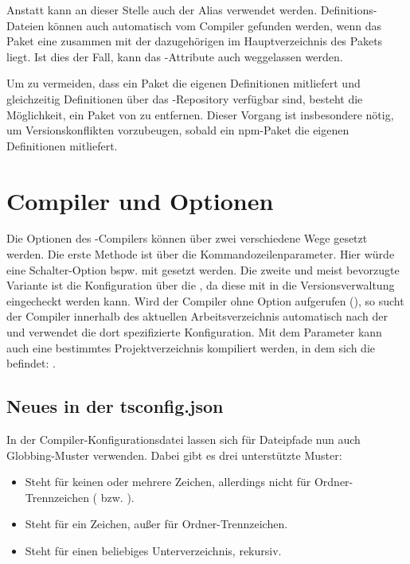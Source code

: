 Anstatt  kann an dieser Stelle auch der Alias  verwendet werden. Definitions-Dateien können auch automatisch vom Compiler gefunden werden, wenn das Paket eine  zusammen mit der dazugehörigen  im Hauptverzeichnis des Pakets liegt. Ist dies der Fall, kann das -Attribute auch weggelassen werden.

Um zu vermeiden, dass ein Paket die eigenen Definitionen mitliefert und gleichzeitig Definitionen über das \dt-Re\-po\-si\-to\-ry verfügbar sind, besteht die Möglichkeit, ein Paket von \dt zu entfernen. Dieser Vorgang ist insbesondere nötig, um  Versionskonflikten vorzubeugen, sobald ein npm-Paket die eigenen Definitionen mitliefert.

\section{Compiler und Optionen}
\label{options}
Die Optionen des \ts-Compilers können über zwei verschiedene Wege gesetzt werden. Die erste Methode ist über die Kommandozeilenparameter. Hier würde eine Schalter-Option bspw. mit  gesetzt werden. Die zweite und meist bevorzugte Variante ist die Konfiguration über die \tsconfig, da diese mit in die Versionsverwaltung eingecheckt werden kann. Wird der Compiler ohne Option aufgerufen (), so sucht der Compiler innerhalb des aktuellen Arbeitsverzeichnis automatisch nach der \tsconfig und verwendet die dort spezifizierte Konfiguration. Mit dem Parameter  kann auch eine bestimmtes Projektverzeichnis kompiliert werden, in dem sich die \tsconfig befindet: .

\subsection{Neues in der tsconfig.json}
In der Compiler-Konfigurationsdatei \tsconfig lassen sich für Dateipfade nun auch Globbing-Muster verwenden. Dabei gibt es drei unterstützte Muster:

\begin{itemize}
\item \incode{*} Steht für keinen oder mehrere Zeichen, allerdings nicht für Ordner-Trennzeichen ( bzw. ).
\item {} Steht für ein Zeichen, außer für Ordner-Trennzeichen.
\item \incode{**/} Steht für einen beliebiges Unterverzeichnis, rekursiv.
\end{itemize}


